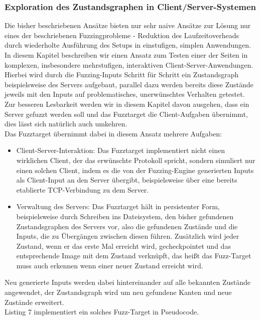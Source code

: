\documentclass[a4paper]{article}
\begin{document}
\subsubsection{Exploration des Zustandsgraphen in Client/Server-Systemen}
Die bisher beschriebenen Ansätze bieten nur sehr naive Ansätze zur Lösung nur eines der beschriebenen Fuzzingprobleme - Reduktion des Laufzeitoverheads durch wiederholte Ausführung des Setups in einstufigen, simplen Anwendungen. 
In diesem Kapitel beschreiben wir einen Ansatz zum Testen einer der Seiten in komplexen, insbesondere mehrstufigen, interaktiven Client-Server-Anwendungen. 
Hierbei wird durch die Fuzzing-Inputs Schritt für Schritt ein Zustandsgraph beispielsweise des Servers aufgebaut, parallel dazu werden bereits diese Zustände jeweils mit den Inputs auf problematisches, unerwünschtes Verhalten getestet. 
Zur besseren Lesbarkeit werden wir in diesem Kapitel davon ausgehen, dass ein Server gefuzzt werden soll und das Fuzztarget die Client-Aufgaben übernimmt, dies lässt sich natürlich auch umkehren.\\
Das Fuzztarget übernimmt dabei in diesem Ansatz mehrere Aufgaben:
\begin{itemize}
    \item Client-Server-Interaktion: Das Fuzztarget implementiert nicht einen wirklichen Client, der das erwünschte Protokoll spricht, sondern simuliert nur einen solchen Client, indem es die von der Fuzzing-Engine generierten Inputs als Client-Input an den Server übergibt, beispielsweise über eine bereits etablierte TCP-Verbindung zu dem Server.
    \item Verwaltung des Servers: Das Fuzztarget hält in persistenter Form, beispielsweise durch Schreiben ins Dateisystem, den bisher gefundenen Zustandsgraphen des Servers vor, also die gefundenen Zustände und die Inputs, die zu Übergängen zwischen diesen führen. 
        Zusätzlich wird jeder Zustand, wenn er das erste Mal erreicht wird, gecheckpointet und das entsprechende Image mit dem Zustand verknüpft, das heißt das Fuzz-Target muss auch erkennen wenn einer neuer Zustand erreicht wird.
\end{itemize}
Neu generierte Inputs werden dabei hintereinander auf alle bekannten Zustände angewendet, der Zustandsgraph wird um neu gefundene Kanten und neue Zustände erweitert.\\
Listing 7 implementiert ein solches Fuzz-Target in Pseudocode.
\end{document}
